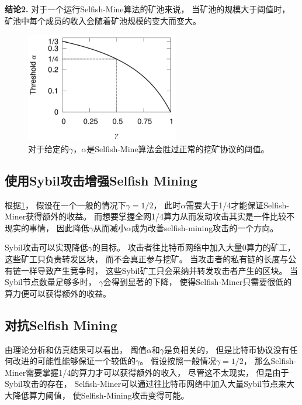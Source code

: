 \documentclass[a4paper, 11pt]{article}
\begin{document}
\begin{CJK*}{UTF8}{gbsn}
    \textbf{结论2.} 对于一个运行Selfish-Mine算法的矿池来说，
    当矿池的规模大于阈值时，
    矿池中每个成员的收入会随着矿池规模的变大而变大。

    \begin{figure}[h]
        \centering
        \includegraphics[width=0.6\textwidth]{figure2}
        \caption{对于给定的$\gamma$，$\alpha$是Selfish-Mine算法会胜过正常的挖矿协议的阈值。}
        \label{figure:figure2}
    \end{figure}
    
    \subsection{使用Sybil攻击增强Selfish Mining}

    根据\ref{figure:figure2}，
    假设在一个一般的情况下$\gamma = 1/2$，
    此时$\alpha$需要大于1/4才能保证Selfish-Miner获得额外的收益。
    而想要掌握全网1/4算力从而发动攻击其实是一件比较不现实的事情，
    因此降低$\gamma$从而减小$\alpha$成为改善selfish-mining攻击的一个方向。

    Sybil攻击可以实现降低$\gamma$的目标。
    攻击者往比特币网络中加入大量0算力的矿工，
    这些矿工只负责转发区块，
    而不会真正参与挖矿。
    当攻击者的私有链的长度与公有链一样导致产生竞争时，
    这些Sybil矿工只会采纳并转发攻击者产生的区块。
    当Sybil节点数量足够多时，
    $\gamma$会得到显著的下降，
    使得Selfish-Miner只需要很低的算力便可以获得额外的收益。

    \subsection{对抗Selfish Mining}

    由理论分析和仿真结果可以看出，
    阈值$\alpha$和$\gamma$是负相关的，
    但是比特币协议没有任何改进的可能性能够保证一个较低的$\gamma$。
    假设按照一般情况$\gamma = 1/2$，
    那么Selfish-Miner需要掌握1/4的算力才可以获得额外的收入，
    尽管这不太现实，
    但是由于Sybil攻击的存在，
    Selfish-Miner可以通过往比特币网络中加入大量Sybil节点来大大降低算力阈值，
    使Selfish-Mining攻击变得可能。


\end{CJK*}
\end{document}
